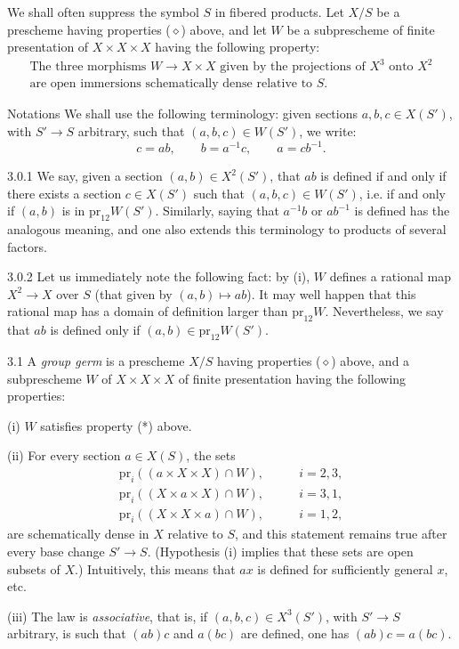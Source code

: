We shall often suppress the symbol \(S\)
in fibered products.
Let \(X/S\) be a prescheme having properties
(\(\diamond\)) above, and let \(W\) be a
subprescheme of finite presentation of
\(X\times X\times X\) having the following property:
\[
\begin{gathered}
\text{The three morphisms }W\to X\times X
\text{ given by the projections of }X^3\text{ onto }X^2\\
\text{are open immersions schematically dense relative to }S.
\end{gathered}\tag{*}
\]
\begin{enoncerm}{Notations}{}
We shall use the following terminology:
given sections \(a,b,c\in X(S')\), with
\(S'\to S\) arbitrary, such that
\((a,b,c)\in W(S')\), we write:
\[
c=ab,\qquad b=a^{-1}c,\qquad a=cb^{-1}.
\]
\end{enoncerm}
\begin{definition}{3.0.1}\label{XVIII.3.0.1}
We say, given a section \((a,b)\in X^2(S')\),
that \(ab\) is defined if and only if
there exists a section \(c\in X(S')\)
such that \((a,b,c)\in W(S')\),
i.e. if and only if \((a,b)\) is in
\(\mathrm{pr}_{12}W(S')\).
Similarly, saying that \(a^{-1}b\) or
\(ab^{-1}\) is defined has the analogous
meaning, and one also extends this
terminology to products of several factors.
\end{definition}
\begin{remark}{3.0.2}\label{XVIII.3.0.2}
Let us immediately note the following fact:
by (i), \(W\) defines a rational map
\(X^2\to X\) over \(S\) (that given by
\((a,b)\mapsto ab\)).
It may well happen that this rational
map has a domain of definition larger
than \(\mathrm{pr}_{12}W\).
Nevertheless, we say that \(ab\) is
defined only if \((a,b)\in\mathrm{pr}_{12}W(S')\).
\end{remark}
\begin{definition}{3.1}\label{XVIII.3.1}
A \emph{group germ} is a prescheme \(X/S\)
having properties (\(\diamond\)) above,
and a subprescheme \(W\) of \(X\times X\times X\)
of finite presentation having the following properties:

(i) \(W\) satisfies property (*) above.

(ii) For every section \(a\in X(S)\), the sets
\[
\begin{aligned}
\mathrm{pr}_i((a\times X\times X)\cap W),&\qquad i=2,3,\\
\mathrm{pr}_i((X\times a\times X)\cap W),&\qquad i=3,1,\\
\mathrm{pr}_i((X\times X\times a)\cap W),&\qquad i=1,2,
\end{aligned}
\]
are schematically dense in \(X\)
relative to \(S\), and this statement
remains true after every base change
\(S'\to S\).
(Hypothesis (i) implies that these
sets are open subsets of \(X\).)
Intuitively, this means that
\og \(ax\) is defined for sufficiently
general \(x\)\fg, etc.

(iii) The law is \emph{associative},
that is, if \((a,b,c)\in X^3(S')\),
with \(S'\to S\) arbitrary, is such
that \((ab)c\) and \(a(bc)\) are
defined, one has \((ab)c=a(bc)\).
\end{definition}

